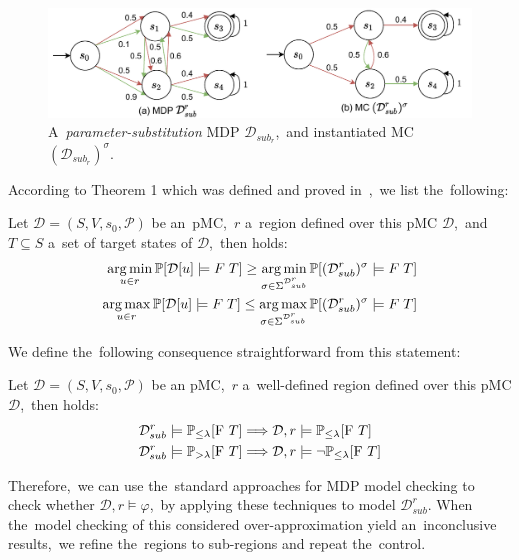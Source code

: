 \begin{figure}[h!]
\centering
\includegraphics[width=1.0\textwidth]{figures/sub_mc.pdf}
\caption{A~\textit{parameter-substitution} MDP $\mathcal{D}_{sub_r}$,~and instantiated MC $(\mathcal{D}_{sub_r})^\sigma$.}%
\label{fig:sub_mc}%
\end{figure}
\noindent
According to Theorem 1 which was defined and proved in~\cite{Quatmann2016},~we list the~following:

\begin{theorem}[]
Let $\mathcal{D} = (S, V, s_0, \mathcal{P})$ be an~pMC,~$r$ a~region defined over this pMC $\mathcal{D}$,~and $T \subseteq S$ a~set of target states of $\mathcal{D}$,~then holds:
\begin{align*}
    \operatorname*{arg\,min}_{u \in r} \mathbb{P}[\mathcal{D}[u] \models F \; T] \geq \operatorname*{arg\,min}_{\sigma \in \Sigma^{\mathcal{D}_{sub}^{r}}} \mathbb{P}[(\mathcal{D}_{sub}^{r})^\sigma \models F \; T] \\
    \operatorname*{arg\,max}_{u \in r} \mathbb{P}[\mathcal{D}[u] \models F \; T] \leq \operatorname*{arg\,max}_{\sigma \in \Sigma^{\mathcal{D}_{sub}^{r}}} \mathbb{P}[(\mathcal{D}_{sub}^{r})^\sigma \models F \; T]
\end{align*}
\end{theorem}
\noindent
We define the~following consequence straightforward from this statement:
\begin{theorem} \label{def:sub_mc_check}
Let $\mathcal{D} = (S, V, s_0, \mathcal{P})$ be an pMC,~$r$ a~well-defined region defined over this pMC $\mathcal{D}$,~then holds:
\begin{align*}
    \mathcal{D}_{sub}^{r} \models \mathbb{P}_{\leq \lambda}[\mathrm{F}\ T] \Longrightarrow \mathcal{D}, r \models & \; \mathbb{P}_{\leq \lambda}[\mathrm{F}\ T] \\
    \mathcal{D}_{sub}^{r} \models \mathbb{P}_{> \lambda}[\mathrm{F}\ T] \Longrightarrow \mathcal{D}, r \models & \; \neg\mathbb{P}_{\leq \lambda}[\mathrm{F}\ T]
\end{align*}
\end{theorem}
\noindent
Therefore,~we can use the~standard approaches for MDP model checking to check whether $\mathcal{D}, r \models \varphi$,~by applying these techniques to model $\mathcal{D}_{sub}^r$.
When the~model checking of this considered over-approximation yield an~inconclusive results,~we refine the~regions to sub-regions and repeat the~control.

